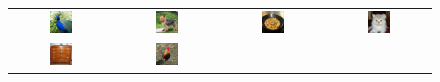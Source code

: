 \begin{figure}[htbp]
\centering
\setlength{\tabcolsep}{1pt}
\begin{tabular}{cccc}
\includegraphics[width=0.24\textwidth]{images/samples0/Peacock0.jpg} & 
\includegraphics[width=0.24\textwidth]{images/samples0/dog0.jpg} &
\includegraphics[width=0.24\textwidth]{images/samples0/wok0.jpg} & 
\includegraphics[width=0.24\textwidth]{images/samples0/Cat0.jpg} \\
\includegraphics[width=0.24\textwidth]{images/samples0/dresser0.jpg} & 
\includegraphics[width=0.24\textwidth]{images/samples0/bird3.jpg} &

\end{tabular}
\end{figure}
